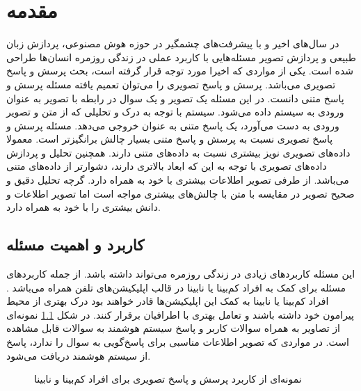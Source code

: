 \chapter{مقدمه}
\thispagestyle{empty}
	در سال‌های اخیر و با پیشرفت‌های چشمگیر در حوزه هوش مصنوعی، پردازش زبان طبیعی و پردازش تصویر مسئله‌هایی با کاربرد عملی در زندگی روزمره انسان‌ها طراحی شده است. یکی از مواردی که اخیرا مورد توجه قرار گرفته است، بحث پرسش و پاسخ تصویری می‌باشد. پرسش و پاسخ تصویری را می‌توان تعمیم یافته مسئله پرسش و پاسخ متنی دانست. در این مسئله یک تصویر و یک سوال در رابطه با تصویر به عنوان ورودی به سیستم داده می‌شود. سیستم با توجه به درک و تحلیلی که از متن و تصویر ورودی به دست‌ می‌آورد، یک پاسخ متنی به عنوان خروجی می‌دهد. 
	\newline
مسئله پرسش و پاسخ تصویری نسبت به پرسش و پاسخ متنی بسیار چالش برانگیزتر است. معمولا داده‌های تصویری نویز بیشتری نسبت به داده‌های متنی دارند. همچنین تحلیل و پردازش داده‌های تصویری با توجه به این که ابعاد بالاتری دارند، دشوار‌تر از داده‌های متنی می‌باشد. از طرفی تصویر اطلاعات بیشتری با خود به همراه دارد. گرچه تحلیل دقیق و صحیح تصویر در مقایسه با متن با چالش‌های بیشتری مواجه است اما تصویر اطلاعات و دانش بیشتری را با خود به همراه دارد. 
\section{کاربرد و اهمیت مسئله}
این مسئله کاربرد‌‌‌های زیادی در زندگی روزمره می‌تواند داشته باشد. از جمله کاربرد‌های مسئله برای کمک به افراد کم‌بینا یا نابینا در قالب اپلیکیشن‌های تلفن همراه می‌باشد \cite{gurari2018vizwiz}. افراد کم‌بینا یا نابینا به کمک این اپلیکیشن‌ها قادر خواهند بود درک بهتری از محیط پیرامون خود داشته باشند و تعامل بهتری با اطرافیان برقرار کنند. در شکل \ref{vqa-blind} نمونه‌ای از تصاویر به همراه سوالات کاربر و پاسخ سیستم هوشمند به سوالات قابل مشاهده است. در مواردی که تصویر اطلاعات مناسبی برای پاسخ‌گویی به سوال را  ندارد، پاسخ
\newline 
{}
 از سیستم هوشمند دریافت می‌شود.

\begin{figure}[H]
	\caption{نمونه‌ای از کاربرد پرسش و پاسخ تصویری برای افراد کم‌بینا و نابینا
		\cite{gurari2018vizwiz}}
	\label{vqa-blind}
\end{figure}

